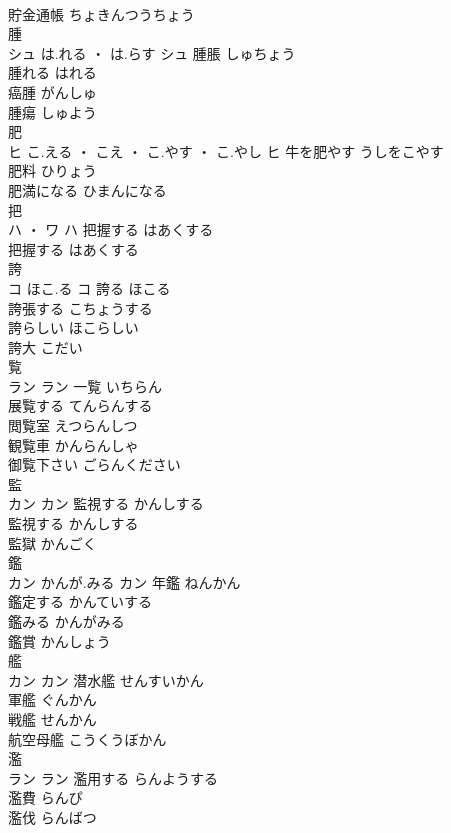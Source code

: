 \documentclass[8pt]{extreport}
\begin{document}
\begin{CJK}{UTF8}{min}
\\	貯金通帳	ちょきんつうちょう	
\\	腫	
\\	シュ	は.れる ・ は.らす	シュ	腫脹	しゅちょう	
\\	腫れる	はれる	
\\	癌腫	がんしゅ	
\\	腫瘍	しゅよう	
\\	肥	
\\	ヒ	こ.える ・ こえ ・ こ.やす ・ こ.やし	ヒ	牛を肥やす	うしをこやす	
\\	肥料	ひりょう	
\\	肥満になる	ひまんになる	
\\	把	
\\	ハ ・ ワ		ハ	把握する	はあくする	
\\	把握する	はあくする	
\\	誇	
\\	コ	ほこ.る	コ	誇る	ほこる	
\\	誇張する	こちょうする	
\\	誇らしい	ほこらしい	
\\	誇大	こだい	
\\	覧	
\\	ラン		ラン	一覧	いちらん	
\\	展覧する	てんらんする	
\\	閲覧室	えつらんしつ	
\\	観覧車	かんらんしゃ	
\\	御覧下さい	ごらんください	
\\	監	
\\	カン		カン	監視する	かんしする	
\\	監視する	かんしする	
\\	監獄	かんごく	
\\	鑑	
\\	カン	かんが.みる	カン	年鑑	ねんかん	
\\	鑑定する	かんていする	
\\	鑑みる	かんがみる	
\\	鑑賞	かんしょう	
\\	艦	
\\	カン		カン	潜水艦	せんすいかん	
\\	軍艦	ぐんかん	
\\	戦艦	せんかん	
\\	航空母艦	こうくうぼかん	
\\	濫	
\\	ラン		ラン	濫用する	らんようする	
\\	濫費	らんぴ	
\\	濫伐	らんばつ	

\end{CJK}
\end{document}
